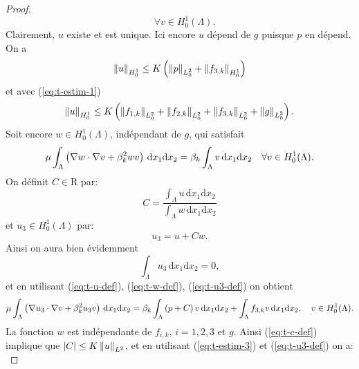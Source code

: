 \begin{proof}
\begin{equation}
    \quad \forall v\in H_0^1(\Lambda).
  \end{equation}
  Clairement, $u$ existe et est unique. Ici encore $u$ dépend de $g$
  puisque $p$ en dépend. On a
  \begin{equation}\label{eq:t-estim-2}
\left\lVert u \right\rVert_{H_0^1} \leq K\left( \left\lVert p \right\rVert_{L^2_0} + \left\lVert f_{3,k} \right\rVert_{H^1_0} \right)
  \end{equation}
  et avec (\ref{eq:t-estim-1})
  \begin{equation}\label{eq:t-estim-3}
    \norm{u}_{H_0^1} %
    \leq K\parent{\norm{f_{1,k}}_{L^2_0} %
      + \norm{f_{2,k}}_{L^2_0} %
      + \norm{f_{3,k}}_{L^2_0} %
      + \norm{g}_{L^2_0}}.
  \end{equation}
  Soit encore $w \in H_0^1(\Lambda)$, indépendant de $g$, qui satisfait
  \begin{equation}\label{eq:t-w-def}
    \mu \int_\Lambda \parent{\nabla w\cdot\nabla v %
      + \beta_k^2 wv}\,\mathrm dx_1\mathrm dx_2 %
    = \beta_k \int_\Lambda v\,\mathrm dx_1\mathrm dx_2 %
    \quad \forall v\in H_0^1(\Lambda).
  \end{equation}
  On définit $C\in\mathrm R$ par:
  \begin{equation}\label{eq:t-c-def}
    C = \frac{\displaystyle\int_\Lambda u\,\mathrm dx_1\mathrm dx_2}%
             {\displaystyle\int_\Lambda w\,\mathrm dx_1\mathrm dx_2}
  \end{equation}
  et $u_3\in H_0^1(\Lambda)$ par:
  \begin{equation}\label{eq:t-u3-def}
    u_3 = u + Cw.
  \end{equation}
  Ainsi on aura bien évidemment
  \begin{equation}
    \int_\Lambda u_3\,\mathrm dx_1\mathrm dx_2 = 0,
  \end{equation}
  et en utilisant (\ref{eq:t-u-def}), (\ref{eq:t-w-def}),
  (\ref{eq:t-u3-def}) on obtient
  \begin{equation}
    \mu\int_\Lambda \parent{\nabla u_3\cdot \nabla v %
                            + \beta_k^2 u_3 v}\,\mathrm dx_1\mathrm dx_2 %
    = \beta_k\int_\Lambda \parent{p + C}v \,\mathrm dx_1\mathrm dx_2 %
    + \int_\Lambda f_{3,k}v\,\mathrm dx_1\mathrm dx_2, %
    \quad v\in H_0^1(\Lambda).
  \end{equation}
  La fonction $w$ est indépendante de $f_{i,k}$, $i = 1,2,3$ et
  $g$. Ainsi (\ref{eq:t-c-def}) implique que $\left\lvert C \right\rvert\leq
  K\left\lVert u \right\rVert_{L^2}$, et en utilisant (\ref{eq:t-estim-3}) et
  (\ref{eq:t-u3-def}) on a:
  \begin{equation}\label{eq:t-estim-4}

\end{equation}
\end{proof}
